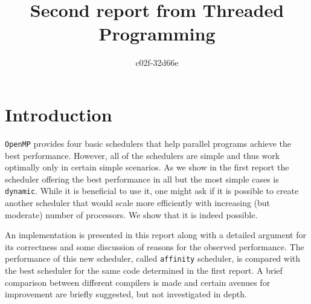 \documentclass[11pt,a4paper]{article}
\begin{document}
\title{Second report from Threaded Programming}
\author{c02f-32d66e}
\maketitle

\section{Introduction}
\texttt{OpenMP} provides four basic schedulers that help parallel programs achieve the best performance. However, all of the schedulers are simple and thus work optimally only in certain simple scenarios. As we show in the first report the scheduler offering the best performance in all but the most simple cases is \texttt{dynamic}. While it is beneficial to use it, one might ask if it is possible to create another scheduler that would scale more efficiently with increasing (but moderate) number of processors. We show that it is indeed possible.

An implementation is presented in this report along with a detailed argument for its correctness and some discussion of reasons for the observed performance. The performance of this new scheduler, called \texttt{affinity} scheduler, is compared with the best scheduler for the same code determined in the first report. A brief comparison between different compilers is made and certain avenues for improvement are briefly suggested, but not investigated in depth.
\end{document}

